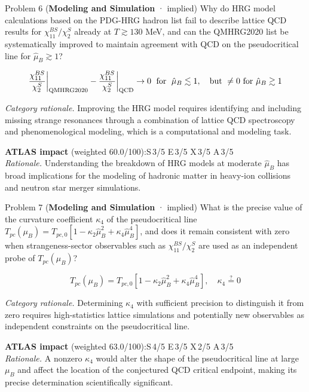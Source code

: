 \documentclass[11pt,letterpaper]{article}
\begin{document}
\begin{opbox}{Problem 6 \textnormal{\small(\textcolor{catModel}{\textbf{Modeling and Simulation}} · implied)}}
Why do HRG model calculations based on the PDG-HRG hadron list fail to describe lattice QCD results for $\chi_{11}^{BS}/\chi_2^S$ already at $T \gtrsim 130$ MeV, and can the QMHRG2020 list be systematically improved to maintain agreement with QCD on the pseudocritical line for $\hat{\mu}_B \gtrsim 1$?
\vspace{2pt}\begin{mathcap}\[\frac{\chi_{11}^{BS}}{\chi_2^S}\bigg|_{\rm QMHRG2020} - \frac{\chi_{11}^{BS}}{\chi_2^S}\bigg|_{\rm QCD} \to 0 \;\text{ for }\; \hat{\mu}_B \lesssim 1,\quad \text{but } \neq 0 \text{ for } \hat{\mu}_B \gtrsim 1\]\end{mathcap}
\vspace{3pt}
{\small\textit{Category rationale.} Improving the HRG model requires identifying and including missing strange resonances through a combination of lattice QCD spectroscopy and phenomenological modeling, which is a computational and modeling task.}
\vspace{3pt}

{\footnotesize\textbf{ATLAS impact} (weighted 60.0/100):\quad S\,3/5 \quad E\,3/5 \quad X\,3/5 \quad A\,3/5\\
\textit{Rationale.} Understanding the breakdown of HRG models at moderate $\hat{\mu}_B$ has broad implications for the modeling of hadronic matter in heavy-ion collisions and neutron star merger simulations.}
\end{opbox}


\begin{opbox}{Problem 7 \textnormal{\small(\textcolor{catModel}{\textbf{Modeling and Simulation}} · implied)}}
What is the precise value of the curvature coefficient $\kappa_4$ of the pseudocritical line $T_{pc}(\mu_B) = T_{pc,0}[1 - \kappa_2\hat{\mu}_B^2 + \kappa_4\hat{\mu}_B^4]$, and does it remain consistent with zero when strangeness-sector observables such as $\chi_{11}^{BS}/\chi_2^S$ are used as an independent probe of $T_{pc}(\mu_B)$?
\vspace{2pt}\begin{mathcap}\[T_{pc}(\mu_B) = T_{pc,0}\left[1 - \kappa_2\hat{\mu}_B^2 + \kappa_4\hat{\mu}_B^4\right],\quad \kappa_4 \stackrel{?}{=} 0\]\end{mathcap}
\vspace{3pt}
{\small\textit{Category rationale.} Determining $\kappa_4$ with sufficient precision to distinguish it from zero requires high-statistics lattice simulations and potentially new observables as independent constraints on the pseudocritical line.}
\vspace{3pt}

{\footnotesize\textbf{ATLAS impact} (weighted 63.0/100):\quad S\,4/5 \quad E\,3/5 \quad X\,2/5 \quad A\,3/5\\
\textit{Rationale.} A nonzero $\kappa_4$ would alter the shape of the pseudocritical line at large $\mu_B$ and affect the location of the conjectured QCD critical endpoint, making its precise determination scientifically significant.}
\end{opbox}
\end{document}
